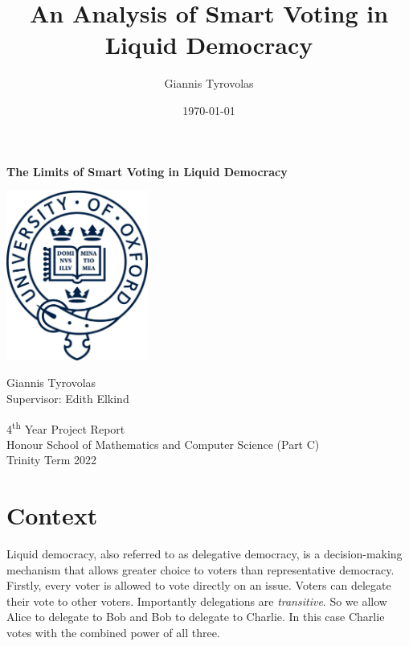\documentclass[11pt,a4paper, titlepage]{article}
\title{An Analysis of Smart Voting in Liquid Democracy}
\author{Giannis Tyrovolas}
\date{\today}
\theoremstyle{definition}
\begin{document}
\begin{titlepage}
    \begin{center}
        \huge
        \textbf{The Limits of Smart Voting in Liquid Democracy}

        \vfill
        
        \includegraphics[width=0.35\textwidth]{logo.jpeg}
        
        \vfill
        
        \LARGE
        Giannis Tyrovolas \\
        \Large
        Supervisor: Edith Elkind\\
        
        \vspace*{1.5cm}
        
        4\textsuperscript{th} Year Project Report\\
        Honour School of Mathematics and Computer Science (Part C) \\
        \vspace*{.5cm}
        Trinity Term 2022
    \end{center}

\end{titlepage}

\tableofcontents

\newpage

\section{Context}

Liquid democracy, also referred to as delegative democracy, is a decision-making mechanism that allows greater choice to voters than representative democracy.
Firstly, every voter is allowed to vote directly on an issue. Voters can delegate their vote to other voters.
Importantly delegations are \emph{transitive}. So we allow Alice to delegate to Bob and Bob to delegate to Charlie. In this case Charlie votes with the combined power of all three.
\end{document}

